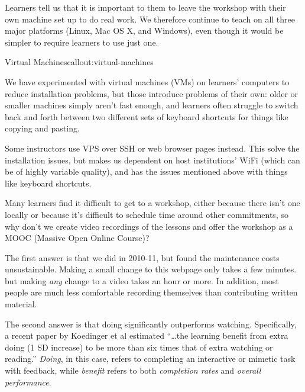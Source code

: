 
Learners tell us that it is important to them to leave the workshop
with their own machine set up to do real work. We therefore continue
to teach on all three major platforms (Linux, Mac OS X, and Windows),
even though it would be simpler to require learners to use just one.


\begin{callout}{Virtual Machines}{callout:virtual-machines}

We have experimented with virtual machines (VMs) on learners'
computers to reduce installation problems, but those introduce
problems of their own: older or smaller machines simply aren't fast
enough, and learners often struggle to switch back and forth between
two different sets of keyboard shortcuts for things like copying and
pasting.

Some instructors use VPS over SSH or web browser pages instead. This
solve the installation issues, but makes us dependent on host
institutions' WiFi (which can be of highly variable quality), and has
the issues mentioned above with things like keyboard shortcuts.

\end{callout}


Many learners find it difficult to get to a workshop, either because
there isn't one locally or because it's difficult to schedule time
around other commitments, so why don't we create video recordings of
the lessons and offer the workshop as a MOOC (Massive Open Online
Course)?

The first answer is that we did in 2010-11, but found the maintenance
costs unsustainable. Making a small change to this webpage only takes
a few minutes. but making \emph{any} change to a video takes an hour
or more. In addition, most people are much less comfortable recording
themselves than contributing written material.

The second answer is that doing significantly outperforms watching.
Specifically, a recent paper by Koedinger et
al \cite{bib:koedinger-doing-watching} estimated ``{\ldots}the
learning benefit from extra doing (1 SD increase) to be more than six
times that of extra watching or reading.'' \emph{Doing}, in this case,
refers to completing an interactive or mimetic task with feedback,
while \emph{benefit} refers to both \emph{completion rates}
and \emph{overall performance}.

